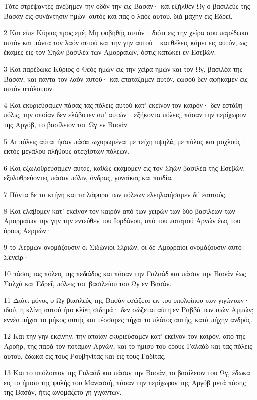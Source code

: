 \par Τότε στρέψαντες ανέβημεν την οδόν την εις Βασάν· και εξήλθεν Ωγ ο βασιλεύς της Βασάν εις συνάντησιν ημών, αυτός και πας ο λαός αυτού, διά μάχην εις Εδρεΐ.
\par 2 Και είπε Κύριος προς εμέ, Μη φοβηθής αυτόν· διότι εις την χείρα σου παρέδωκα αυτόν και πάντα τον λαόν αυτού και την γην αυτού· και θέλεις κάμει εις αυτόν, ως έκαμες εις τον Σηών βασιλέα των Αμορραίων, όστις κατώκει εν Εσεβών.
\par 3 Και παρέδωκε Κύριος ο Θεός ημών εις την χείρα ημών και τον Ωγ, βασιλέα της Βασάν, και πάντα τον λαόν αυτού· και επατάξαμεν αυτόν, εωσού δεν αφήκαμεν εις αυτόν υπόλοιπον.
\par 4 Και εκυριεύσαμεν πάσας τας πόλεις αυτού κατ' εκείνον τον καιρόν· δεν εστάθη πόλις, την οποίαν δεν ελάβομεν απ' αυτών· εξήκοντα πόλεις, πάσαν την περίχωρον της Αργόβ, το βασίλειον του Ωγ εν Βασάν.
\par 5 Αι πόλεις αύται ήσαν πάσαι ωχυρωμέναι με τείχη υψηλά, με πύλας και μοχλούς· εκτός μεγάλου πλήθους ατειχίστων πόλεων.
\par 6 Και εξωλοθρεύσαμεν αυτάς, καθώς εκάμομεν εις τον Σηών βασιλέα της Εσεβών, εξολοθρεύοντες πάσαν πόλιν, άνδρας, γυναίκας και παιδία.
\par 7 Πάντα δε τα κτήνη και τα λάφυρα των πόλεων ελεηλατήσαμεν δι' εαυτούς.
\par 8 Και ελάβομεν κατ' εκείνον τον καιρόν από των χειρών των δύο βασιλέων των Αμορραίων την γην την εντεύθεν του Ιορδάνου, από του ποταμού Αρνών έως του όρους Αερμών·
\par 9 το Αερμών ονομάζουσιν οι Σιδώνιοι Σιριών, οι δε Αμορραίοι ονομάζουσιν αυτό Σενείρ·
\par 10 πάσας τας πόλεις της πεδιάδος και πάσαν την Γαλαάδ και πάσαν την Βασάν έως Σαλχά και Εδρεΐ, πόλεις του βασιλείου του Ωγ εν Βασάν.
\par 11 Διότι μόνος ο Ωγ βασιλεύς της Βασάν εσώζετο εκ του υπολοίπου των γιγάντων· ιδού, η κλίνη αυτού ήτο κλίνη σιδηρά· δεν σώζεται αύτη εν Ραββά των υιών Αμμών; εννέα πήχαι το μήκος αυτής και τέσσαρες πήχαι το πλάτος αυτής, κατά πήχην ανδρός.
\par 12 Και την γην εκείνην, την οποίαν εκυριεύσαμεν κατ' εκείνον τον καιρόν, από της Αροήρ, της παρά τον ποταμόν Αρνών, και το ήμισυ του όρους Γαλαάδ και τας πόλεις αυτού, έδωκα εις τους Ρουβηνίτας και εις τους Γαδίτας.
\par 13 Και το υπόλοιπον της Γαλαάδ και πάσαν την Βασάν, το βασίλειον του Ωγ, έδωκα εις το ήμισυ της φυλής του Μανασσή, πάσαν την περίχωρον της Αργόβ μετά πάσης της Βασάν, ήτις ωνομάζετο γη γιγάντων.
